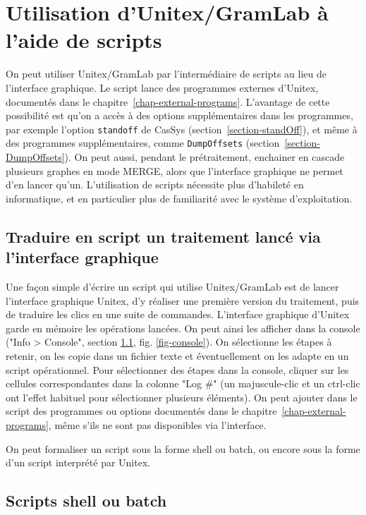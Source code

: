 \chapter{Utilisation d'Unitex/GramLab à l'aide de scripts}
\label{chap-scripts}

On peut utiliser Unitex/GramLab par l'intermédiaire de scripts au lieu de l'interface graphique.
Le script lance des programmes externes d'Unitex, documentés dans le
chapitre~\ref{chap-external-programs}. L'avantage de cette possibilité est qu'on a accès à des options
supplémentaires dans les programmes, par exemple l'option \verb$standoff$ de CasSys
(section~\ref{section-standOff}), et même à des programmes supplémentaires, comme
\verb$DumpOffsets$ (section~\ref{section-DumpOffsets}). On peut aussi, pendant le prétraitement,
enchainer en cascade plusieurs graphes en mode MERGE, alors que l'interface graphique ne permet d'en
lancer qu'un.
L'utilisation de scripts nécessite plus d'habileté en informatique, et en particulier plus de familiarité
avec le système d'exploitation.

\section{Traduire en script un traitement lancé via l'interface graphique}
\label{section-console}

Une façon simple d'écrire un script qui utilise Unitex/GramLab est de lancer l'interface graphique Unitex,
d'y réaliser une première version du traitement, puis de traduire les clics en une suite de commandes.
L'interface graphique d'Unitex garde en mémoire les opérations lancées. On peut ainsi les afficher dans la
console ("Info > Console", section \ref{section-console}, fig. \ref{fig-console}). On sélectionne les étapes
à retenir, on les copie dans un fichier texte et éventuellement on les adapte en un script opérationnel.
Pour sélectionner des étapes dans la console, cliquer sur les cellules correspondantes dans la colonne
"Log \#" (un majuscule-clic et un ctrl-clic ont l'effet habituel pour sélectionner plusieurs éléments).
On peut ajouter dans le script des programmes ou options documentés dans le
chapitre~\ref{chap-external-programs}, même s'ils ne sont pas disponibles via l'interface.

\bigskip
\noindent On peut formaliser un script sous la forme shell ou batch, ou encore sous la forme d'un script
interprété par Unitex.

\section{Scripts shell ou batch}
\label{section-batch}

